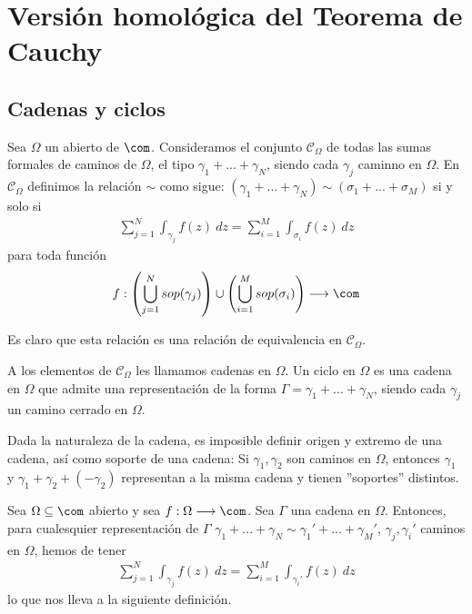 \chapter{Versión homológica del Teorema de Cauchy}

\section{Cadenas y ciclos}

\begin{defi}
Sea $\Omega$ un abierto de $\com$. Consideramos el conjunto $\mathscr{C}_{\Omega}$ de todas las sumas formales de caminos de $\Omega$, el tipo $\gamma_1 + ... + \gamma_N$, siendo cada $\gamma_j$ caminno en $\Omega$. En $\mathscr{C}_{\Omega}$ definimos la relación $\sim$ como sigue: $(\gamma_1 + ... + \gamma_N) \sim (\sigma_1 + ... + \sigma_M)$ si y solo si
\begin{align*}
    \sum_{j=1}^{N} \int_{\gamma_j} f(z) \ dz = \sum_{i=1}^{M} \int_{\sigma_i} f(z) \ dz
\end{align*}
para toda función 
\begin{align*}
    f : \left(\bigcup_{j=1}^{N} sop(\gamma_j)\right) \cup \left(\bigcup_{i=1}^{M} sop(\sigma_i)\right) \longrightarrow \com
\end{align*}
\end{defi}

\begin{obs}
Es claro que esta relación es una relación de equivalencia en $\mathscr{C}_{\Omega}$.
\end{obs}

\begin{defi}
A los elementos de $\mathscr{C}_{\Omega}$ les llamamos cadenas en $\Omega$. Un ciclo en $\Omega$ es una cadena en $\Omega$ que admite una representación de la forma $\Gamma = \gamma_1 + ... + \gamma_N$, siendo cada $\gamma_j$ un camino cerrado en $\Omega$.
\end{defi}

\begin{obs}
Dada la naturaleza de la cadena, es imposible definir origen y extremo de una cadena, así como soporte de una cadena: Si $\gamma_1,\gamma_2$ son caminos en $\Omega$, entonces $\gamma_1$ y $\gamma_1 + \gamma_2 + (-\gamma_2)$ representan a la misma cadena y tienen ''soportes'' distintos.
\end{obs}

\begin{obs}
Sea $\Omega \subseteq \com$ abierto y sea $f: \Omega \longrightarrow \com$. Sea $\Gamma$ una cadena en $\Omega$. Entonces, para cualesquier representación de $\Gamma$ $\gamma_1 + ... + \gamma_N \sim \gamma_1' + ... + \gamma_M'$, $\gamma_j,\gamma_i'$ caminos en $\Omega$, hemos de tener  
\begin{align*}
    \sum_{j=1}^{N} \int_{\gamma_j} f(z) \ dz = \sum_{i=1}^{M} \int_{\gamma_i'} f(z) \ dz
\end{align*}
lo que nos lleva a la siguiente definición.
\end{obs}

